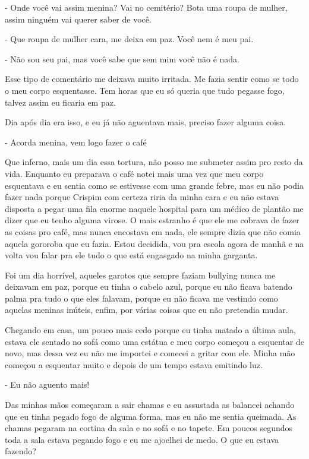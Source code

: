 - Onde você vai assim menina? Vai no cemitério? Bota uma roupa de mulher, assim ninguém vai querer saber de você.

- Que roupa de mulher cara, me deixa em paz. Você nem é meu pai.

- Não sou seu pai, mas você sabe que sem mim você não é nada.

Esse tipo de comentário me deixava muito irritada. Me fazia sentir como se todo o meu corpo esquentasse. Tem horas que eu só queria que tudo pegasse fogo, talvez assim eu ficaria em paz.

Dia após dia era isso, e eu já não aguentava mais, preciso fazer alguma coisa.

- Acorda menina, vem logo fazer o café

Que inferno, mais um dia essa tortura, não posso me submeter assim pro resto da vida. Enquanto eu preparava o café notei mais uma vez que meu corpo esquentava e eu sentia como se estivesse com uma grande febre, mas eu não podia fazer nada porque Crispim com certeza riria da minha cara e eu não estava disposta a pegar uma fila enorme naquele hospital para um médico de plantão me dizer que eu tenho alguma virose. O mais estranho é que ele me cobrava de fazer as coisas pro café, mas nunca encostava em nada, ele sempre dizia que não comia aquela gororoba que eu fazia. Estou decidida, vou pra escola agora de manhã e na volta vou falar pra ele tudo o que está engasgado na minha garganta.

Foi um dia horrível, aqueles garotos que sempre faziam bullying nunca me deixavam em paz, porque eu tinha o cabelo azul, porque eu não ficava batendo palma pra tudo o que eles falavam, porque eu não ficava me vestindo como aquelas meninas inúteis, enfim, por várias coisas que eu não pretendia mudar.

Chegando em casa, um pouco mais cedo porque eu tinha matado a última aula, estava ele sentado no sofá como uma estátua e meu corpo começou a esquentar de novo, mas dessa vez eu não me importei e comecei a gritar com ele. Minha mão começou a esquentar muito e depois de um tempo estava emitindo luz.

- Eu não aguento mais!

Das minhas mãos começaram a sair chamas e eu assustada as balancei achando que eu tinha pegado fogo de alguma forma, mas eu não me sentia queimada. As chamas pegaram na cortina da sala e no sofá e no tapete. Em poucos segundos toda a sala estava pegando fogo e eu me ajoelhei de medo. O que eu estava fazendo?

